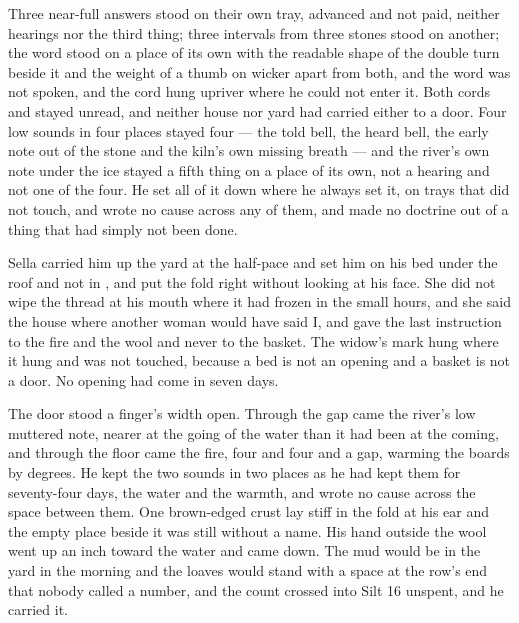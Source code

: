 Three near-full answers stood on their own tray, advanced and not paid, neither hearings nor the third thing; three intervals from three stones stood on another; the word stood on a place of its own with the readable shape of the double turn beside it and the weight of a thumb on wicker apart from both, and the word was not spoken, and the cord hung upriver where he could not enter it. Both cords and  stayed unread, and neither house nor yard had carried either to a door. Four low sounds in four places stayed four --- the told bell, the heard bell, the early note out of the stone and the kiln's own missing breath --- and the river's own note under the ice stayed a fifth thing on a place of its own, not a hearing and not one of the four. He set all of it down where he always set it, on trays that did not touch, and wrote no cause across any of them, and made no doctrine out of a thing that had simply not been done.

Sella carried him up the yard at the half-pace and set him on his bed under the roof and not in , and put the fold right without looking at his face. She did not wipe the thread at his mouth where it had frozen in the small hours, and she said the house where another woman would have said I, and gave the last instruction to the fire and the wool and never to the basket. The widow's mark hung where it hung and was not touched, because a bed is not an opening and a basket is not a door. No opening had come in seven days.

The door stood a finger's width open. Through the gap came the river's low muttered note, nearer at the going of the water than it had been at the coming, and through the floor came the fire, four and four and a gap, warming the boards by degrees. He kept the two sounds in two places as he had kept them for seventy-four days, the water and the warmth, and wrote no cause across the space between them. One brown-edged crust lay stiff in the fold at his ear and the empty place beside it was still without a name. His hand outside the wool went up an inch toward the water and came down. The mud would be in the yard in the morning and the loaves would stand with a space at the row's end that nobody called a number, and the count crossed into Silt 16 unspent, and he carried it.
